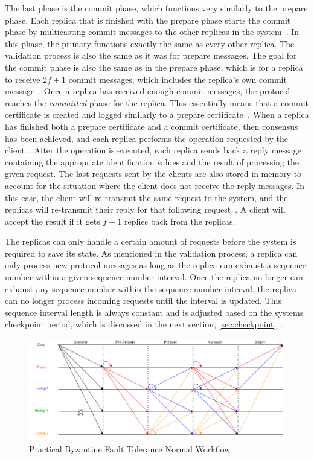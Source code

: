The last phase is the commit phase, which functions very similarly to the prepare phase. Each replica that is finished with the prepare phase starts the commit phase by multicasting commit messages to the other replicas in the system~\cite[p.~4]{PAPER:OGPBFT}. In this phase, the primary functions exactly the same as every other replica. The validation process is also the same as it was for prepare messages. The goal for the commit phase is also the same as in the prepare phase, which is for a replica to receive $2f+1$ commit messages, which includes the replica’s own commit message~\cite[p.~5]{PAPER:OGPBFT}. Once a replica has received enough commit messages, the protocol reaches the \emph{committed} phase for the replica. This essentially means that a commit certificate is created and logged similarly to a prepare certificate~\cites[p.~409]{PAPER:PBFTRecovery}[p.~457]{BOOK:MVstandver3}. When a replica has finished both a prepare certificate and a commit certificate, then consensus has been achieved, and each replica performs the operation requested by the client~\cites[p.~409]{PAPER:PBFTRecovery}[p.~5]{PAPER:OGPBFT}. After the operation is executed, each replica sends back a reply message containing the appropriate identification values and the result of processing the given request. The last requests sent by the clients are also stored in memory to account for the situation where the client does not receive the reply messages. In this case, the client will re-transmit the same request to the system, and the replicas will re-transmit their reply for that following request~\cite[p.~409]{PAPER:PBFTRecovery}. A client will accept the result if it gets $f+1$ replies back from the replicas.
 
The replicas can only handle a certain amount of requests before the system is required to save its state. As mentioned in the validation process, a replica can only process new protocol messages as long as the replica can exhaust a sequence number within a given sequence number interval. Once the replica no longer can exhaust any sequence number within the sequence number interval, the replica can no longer process incoming requests until the interval is updated. This sequence interval length is always constant and is adjusted based on the systems checkpoint period, which is discussed in the next section, \autoref{sec:checkpoint}~\cites[p.~262]{BOOK:BuildDepDistSyst}[p.~4-5]{PAPER:OGPBFT}.


\begin{figure}[!h]
	\centering
	\includegraphics[width=\linewidth]{figures/PBFTWorkflow}
	\caption{Practical Byzantine Fault Tolerance Normal Workflow}
	\label{fig:pbftnormalworkflow}
\end{figure}

